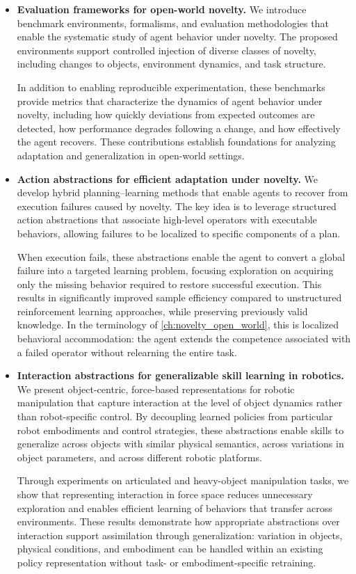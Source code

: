 \begin{itemize}

\item \textbf{Evaluation frameworks for open-world novelty.}  
We introduce benchmark environments, formalisms, and evaluation methodologies that enable the systematic study of agent behavior under novelty. The proposed environments support controlled injection of diverse classes of novelty, including changes to objects, environment dynamics, and task structure.

In addition to enabling reproducible experimentation, these benchmarks provide metrics that characterize the dynamics of agent behavior under novelty, including how quickly deviations from expected outcomes are detected, how performance degrades following a change, and how effectively the agent recovers. These contributions establish foundations for analyzing adaptation and generalization in open-world settings.

\item \textbf{Action abstractions for efficient adaptation under novelty.}  
We develop hybrid planning--learning methods that enable agents to recover from execution failures caused by novelty. The key idea is to leverage structured action abstractions that associate high-level operators with executable behaviors, allowing failures to be localized to specific components of a plan.

When execution fails, these abstractions enable the agent to convert a global failure into a targeted learning problem, focusing exploration on acquiring only the missing behavior required to restore successful execution. This results in significantly improved sample efficiency compared to unstructured reinforcement learning approaches, while preserving previously valid knowledge. In the terminology of \cref{ch:novelty_open_world}, this is localized behavioral accommodation: the agent extends the competence associated with a failed operator without relearning the entire task.

\item \textbf{Interaction abstractions for generalizable skill learning in robotics.}  
We present object-centric, force-based representations for robotic manipulation that capture interaction at the level of object dynamics rather than robot-specific control. By decoupling learned policies from particular robot embodiments and control strategies, these abstractions enable skills to generalize across objects with similar physical semantics, across variations in object parameters, and across different robotic platforms.

Through experiments on articulated and heavy-object manipulation tasks, we show that representing interaction in force space reduces unnecessary exploration and enables efficient learning of behaviors that transfer across environments. These results demonstrate how appropriate abstractions over interaction support assimilation through generalization: variation in objects, physical conditions, and embodiment can be handled within an existing policy representation without task- or embodiment-specific retraining.

\end{itemize}

